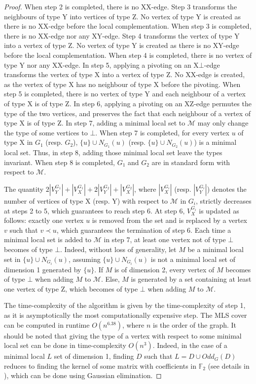\documentclass[a4paper,UKenglish,cleveref,autoref,thm-restate]{arxiv}
\begin{document}
\begin{proof}
     When step 2 is completed, there is no XX-edge. Step 3 transforms the neighbours of type Y into vertices of type Z. No vertex of type Y is created as there is no XX-edge before the local complementation. When step 3 is completed, there is no XX-edge nor any XY-edge. Step 4 transforms the vertex of type Y into a vertex of type Z. No vertex of type Y is created as there is no XY-edge before the local complementation. When step 4 is completed, there is no vertex of type Y nor any XX-edge. In step 5, applying a pivoting on an X$\bot$-edge transforms the vertex of type X into a vertex of type Z. No XX-edge is created, as the vertex of type X has no neighbour of type X before the pivoting. When step 5 is completed, there is no vertex of type Y and each neighbour of a vertex of type X is of type Z. In step 6, applying a pivoting on an XZ-edge permutes the type of the two vertices, and preserves the fact that each neighbour of a vertex of type X is of type Z. In step 7, adding a minimal local set to  $\mathcal M$ may only change the type of some vertices to $\bot$. When step 7 is completed, for every vertex $u$ of type X in $G_1$ (resp. $G_2$), $\{u\} \cup N_{G_1}(u)$ (resp.  $\{u\} \cup N_{G_2}(u)$) is a minimal local set. Thus, in step 8, adding those minimal local set leave the types invariant. When step 8 is completed, $G_1$ and $G_2$ are in standard form with respect to $\mathcal M$.
    
     The quantity $2|V^{G_1}_Y|+|V^{G_1}_X| + 2|V^{G_2}_Y|+|V^{G_2}_X|$, where $|V^{G_i}_X|$ (resp. $|V^{G_i}_Y|$) denotes the number of vertices of type X (resp. Y) with respect to $\mathcal M$ in $G_i$, strictly decreases at steps 2 to 5, which guarantees to reach step 6. At step 6, $V^{G_i}_X$ is updated as follows: exactly one vertex $u$ is removed from the set and is replaced by a vertex $v$ such that $v\prec u$, which guarantees the termination of step 6. Each time a minimal local set is added to $\mathcal M$ in step 7, at least one vertex not of type $\bot$ becomes of type $\bot$. Indeed, without loss of generality, let $M$ be a minimal local set in $\{u\} \cup N_{G_i}(u)$, assuming $\{u\} \cup N_{G_i}(u)$ is not a minimal local set of dimension 1 generated by $\{u\}$. If $M$ is of dimension 2, every vertex of $M$ becomes of type $\bot$ when adding $M$ to $\mathcal M$. Else, $M$ is generated by a set containing at least one vertex of type Z, which becomes of type $\bot$ when adding $M$ to $\mathcal M$.

     The time-complexity of the algorithm is given by the time-complexity of step 1, as it is asymptotically the most computationally expensive step. The MLS cover can be computed in runtime $O(n^{6.38})$, where $n$ is the order of the graph. It should be noted that giving the type of a vertex with respect to some minimal local set can be done in time-complexity $O(n^3)$. Indeed, in the case of a minimal local $L$ set of dimension 1, finding $D$ such that $L = D \cup Odd_G(D)$ reduces to finding the kernel of some matrix with coefficients in $\mathbb F_2$ (see details in \cite{claudet2024covering}), which can be done using Gaussian elimination.
\end{proof}
\end{document}
